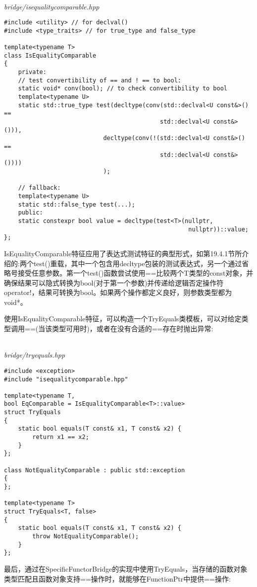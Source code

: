 \hspace*{\fill} \\ %
\noindent
\textit{bridge/isequalitycomparable.hpp}
\begin{lstlisting}[style=styleCXX]
#include <utility> // for declval()
#include <type_traits> // for true_type and false_type

template<typename T>
class IsEqualityComparable
{
	private:
	// test convertibility of == and ! == to bool:
	static void* conv(bool); // to check convertibility to bool
	template<typename U>
	static std::true_type test(decltype(conv(std::declval<U const&>() ==
											std::declval<U const&>())),
							decltype(conv(!(std::declval<U const&>() ==
											std::declval<U const&>())))
							);
	
	// fallback:
	template<typename U>
	static std::false_type test(...);
	public:
	static constexpr bool value = decltype(test<T>(nullptr,
													nullptr))::value;
};
\end{lstlisting}

IsEqualityComparable特征应用了表达式测试特征的典型形式，如第19.4.1节所介绍的:两个test()重载，其中一个包含用decltype包装的测试表达式，另一个通过省略号接受任意参数。第一个test()函数尝试使用==比较两个T类型的const对象，并确保结果可以隐式转换为bool(对于第一个参数)并传递给逻辑否定操作符operator!，结果可转换为bool。如果两个操作都定义良好，则参数类型都为void*。

使用IsEqualityComparable特征，可以构造一个TryEquals类模板，可以对给定类型调用==(当该类型可用时)，或者在没有合适的==存在时抛出异常:

\hspace*{\fill} \\ %
\noindent
\textit{bridge/tryequals.hpp}
\begin{lstlisting}[style=styleCXX]
#include <exception>
#include "isequalitycomparable.hpp"

template<typename T,
bool EqComparable = IsEqualityComparable<T>::value>
struct TryEquals
{
	static bool equals(T const& x1, T const& x2) {
		return x1 == x2;
	}
};

class NotEqualityComparable : public std::exception
{
};

template<typename T>
struct TryEquals<T, false>
{
	static bool equals(T const& x1, T const& x2) {
		throw NotEqualityComparable();
	}
};
\end{lstlisting}

最后，通过在SpecificFunctorBridge的实现中使用TryEquals，当存储的函数对象类型匹配且函数对象支持==操作时，就能够在FunctionPtr中提供==操作:

